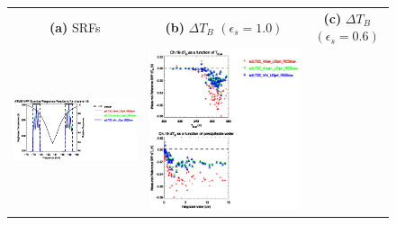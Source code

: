 \begin{figure}[H]
  \centering
  \begin{tabular}{c c c}
    \textsf{\textbf{(a)} SRFs} &
    \textsf{\textbf{(b)} $\Delta T_B$ $(\epsilon_s = 1.0)$} &
    \textsf{\textbf{(c)} $\Delta T_B$ $(\epsilon_s = 0.6)$} \\
    \includegraphics[bb=80 400 280 558,clip,scale=0.85]{graphics/srf/Vset/atms_npp.ch19.osrf.eps} &
    \includegraphics[bb=85 400 260 558,clip,scale=0.85]{graphics/dtb/Vset/e1.0_r0.0/atms_npp.ch19.dTb.eps} & 

\end{tabular}
\end{figure}
